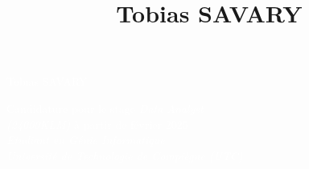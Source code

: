 \documentclass[9pt, oneside, a4paper, titlepage]{extarticle}
\title{Tobias SAVARY}
\date{}
\begin{document}
    
    \begin{tcolorbox}
        \begin{minipage}{0.3\linewidth}
            \hspace*{1cm}
        \end{minipage}%
        \hspace{1cm}%
        \begin{minipage}{0.6\linewidth}
            \begin{center}
                \Huge{\textcolor{white}{Tobias SAVARY}} \\
                \vspace*{0.5cm}
                
                \Large{\textcolor{white}{Candidature pour le stage \emph{Data Analyst \\ (24000KLM)} à partir de février 2025\\}}
                \vspace*{0.5cm}
                \Large{\textcolor{white}{\emph{Etudiant en Génie Informatique \\Université de Technologie de Compiègne (UTC) \\}}}
            \end{center}
        \end{minipage}%
    \end{tcolorbox}
\end{document}
